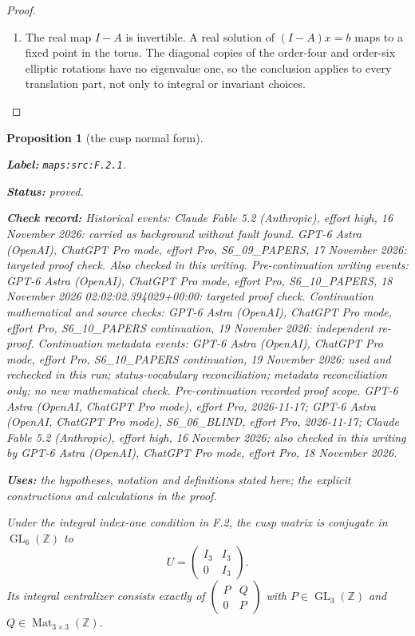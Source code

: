 \documentclass[11pt,a4paper]{article}
\newtheorem{proposition}[proposition]{Proposition}
\theoremstyle{definition}
\newcommand{\StatementRecord}[4]{\par\smallskip\begingroup\upshape\raggedright\noindent\textbf{Label:} \nolinkurl{#1}.\par\noindent\textbf{Status:} #2.\par\noindent\textbf{Check record:} #3.\par\noindent\textbf{Uses:} #4.\par\endgroup\smallskip}
\begin{document}
\begin{proof}
\begin{enumerate}[label=\arabic*.]
\item The real map $I-A$ is invertible.  A real solution of
$(I-A)x=b$ maps to a fixed point in the torus.  The diagonal
copies of the order-four and order-six elliptic rotations have
no eigenvalue one, so the conclusion applies to every translation
part, not only to integral or invariant choices.

\end{enumerate}
\end{proof}




\begin{proposition}[the cusp normal form]\label{maps:src:F.2.1}
\StatementRecord{maps:src:F.2.1}{proved}{Historical events: Claude Fable 5.2 (Anthropic), effort high, 16 November 2026: carried as background without fault found. GPT-6 Astra (OpenAI), ChatGPT Pro mode, effort Pro, S6\_09\_PAPERS, 17 November 2026: targeted proof check. Also checked in this writing. Pre-continuation writing events: GPT-6 Astra (OpenAI), ChatGPT Pro mode, effort Pro, S6\_10\_PAPERS, 18 November 2026 02:02:02.394029+00:00: targeted proof check. Continuation mathematical and source checks: GPT-6 Astra (OpenAI), ChatGPT Pro mode, effort Pro, S6\_10\_PAPERS continuation, 19 November 2026: independent re-proof. Continuation metadata events: GPT-6 Astra (OpenAI), ChatGPT Pro mode, effort Pro, S6\_10\_PAPERS continuation, 19 November 2026: used and rechecked in this run; status-vocabulary reconciliation; metadata reconciliation only; no new mathematical check. \emph{Pre-continuation recorded proof scope.} GPT-6 Astra (OpenAI, ChatGPT Pro mode), effort Pro, 2026-11-17; GPT-6 Astra (OpenAI, ChatGPT Pro mode), S6\_06\_BLIND, effort Pro, 2026-11-17; Claude Fable 5.2 (Anthropic), effort high, 16 November 2026; also checked in this writing by GPT-6 Astra (OpenAI), ChatGPT Pro mode, effort Pro, 18 November 2026}{the hypotheses, notation and definitions stated here; the explicit constructions and calculations in the proof}


Under the integral index-one condition in F.2, the cusp matrix is
conjugate in $\operatorname{GL}_6(\mathbb Z)$ to
\[
 U=\begin{pmatrix}I_3&I_3\\0&I_3\end{pmatrix}.
\]
Its integral centralizer consists exactly of
$\left(\begin{smallmatrix}P&Q\\0&P\end{smallmatrix}\right)$
with $P\in\operatorname{GL}_3(\mathbb Z)$ and
$Q\in\operatorname{Mat}_{3\times3}(\mathbb Z)$.

\end{proposition}
\end{document}
